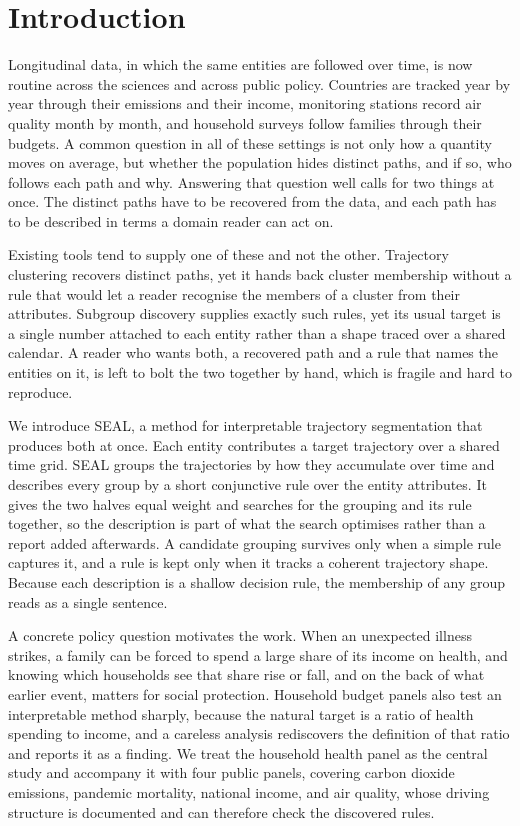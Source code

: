 \section{Introduction}
\label{sec:intro}

Longitudinal data, in which the same entities are followed over time, is now routine across the sciences and across public policy. Countries are tracked year by year through their emissions and their income, monitoring stations record air quality month by month, and household surveys follow families through their budgets. A common question in all of these settings is not only how a quantity moves on average, but whether the population hides distinct paths, and if so, who follows each path and why. Answering that question well calls for two things at once. The distinct paths have to be recovered from the data, and each path has to be described in terms a domain reader can act on.

Existing tools tend to supply one of these and not the other. Trajectory clustering recovers distinct paths, yet it hands back cluster membership without a rule that would let a reader recognise the members of a cluster from their attributes. Subgroup discovery supplies exactly such rules, yet its usual target is a single number attached to each entity rather than a shape traced over a shared calendar. A reader who wants both, a recovered path and a rule that names the entities on it, is left to bolt the two together by hand, which is fragile and hard to reproduce.

We introduce SEAL, a method for interpretable trajectory segmentation that produces both at once. Each entity contributes a target trajectory over a shared time grid. SEAL groups the trajectories by how they accumulate over time and describes every group by a short conjunctive rule over the entity attributes. It gives the two halves equal weight and searches for the grouping and its rule together, so the description is part of what the search optimises rather than a report added afterwards. A candidate grouping survives only when a simple rule captures it, and a rule is kept only when it tracks a coherent trajectory shape. Because each description is a shallow decision rule, the membership of any group reads as a single sentence.

A concrete policy question motivates the work. When an unexpected illness strikes, a family can be forced to spend a large share of its income on health, and knowing which households see that share rise or fall, and on the back of what earlier event, matters for social protection. Household budget panels also test an interpretable method sharply, because the natural target is a ratio of health spending to income, and a careless analysis rediscovers the definition of that ratio and reports it as a finding. We treat the household health panel as the central study and accompany it with four public panels, covering carbon dioxide emissions, pandemic mortality, national income, and air quality, whose driving structure is documented and can therefore check the discovered rules.

